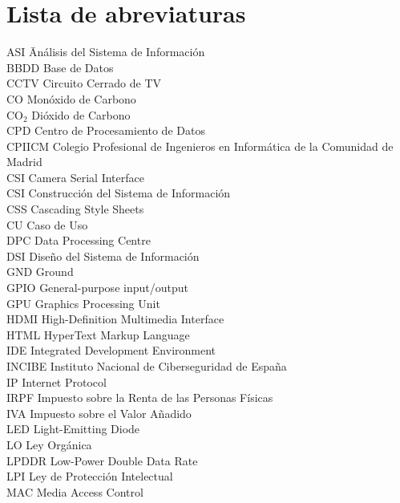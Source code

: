 \newpage %
\thispagestyle{empty}
\mbox{}

\chapter*{Lista de abreviaturas}
\begin{tabbing} %
	ASI \quad\quad\quad\= Análisis del Sistema de Información \\
	BBDD \> Base de Datos \\
	CCTV \> Circuito Cerrado de TV \\
	CO \> Monóxido de Carbono \\
	CO$_2$ \> Dióxido de Carbono \\
	CPD \> Centro de Procesamiento de Datos \\
	CPIICM \> Colegio Profesional de Ingenieros en Informática de la Comunidad de Madrid \\
	CSI \> Camera Serial Interface \\
	CSI \> Construcción del Sistema de Información \\
	CSS \> Cascading Style Sheets \\
	CU \> Caso de Uso \\
	DPC \> Data Processing Centre \\
	DSI \> Diseño del Sistema de Información \\
	GND \> Ground \\
	GPIO \> General-purpose input/output \\
	GPU \> Graphics Processing Unit \\
	HDMI \> High-Definition Multimedia Interface \\
	HTML \> HyperText Markup Language \\
	IDE \> Integrated Development Environment \\
	INCIBE \> Instituto Nacional de Ciberseguridad de España \\
	IP \> Internet Protocol \\
	IRPF \> Impuesto sobre la Renta de las Personas Físicas \\
	IVA \> Impuesto sobre el Valor Añadido \\
	LED \> Light-Emitting Diode \\
	LO \> Ley Orgánica \\
	LPDDR \> Low-Power Double Data Rate \\
	LPI \> Ley de Protección Intelectual \\
	MAC \> Media Access Control \\

\end{tabbing}
